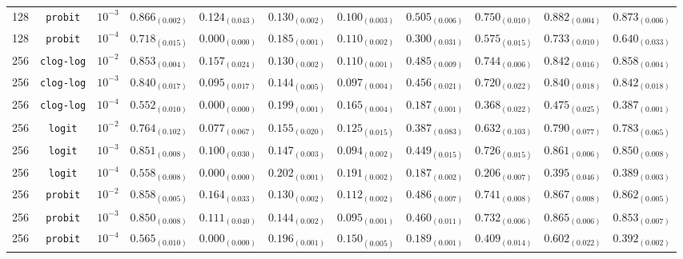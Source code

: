 \documentclass[journal]{IEEEtran}
\begin{document}
\begin{table}[!t]
\begin{tabular}{c@{\hskip 0.15cm}c@{\hskip 0.15cm}c@{\hskip 0.15cm}c@{\hskip 0.30cm}c@{\hskip 0.20cm}c@{\hskip 0.20cm}c@{\hskip 0.20cm}c@{\hskip 0.20cm}c@{\hskip 0.20cm}c@{\hskip 0.20cm}c}
			128 & \texttt{probit} & $10^{-3}$ & $0.866_{(0.002)}$ & $0.124_{(0.043)}$ & $0.130_{(0.002)}$ & $0.100_{(0.003)}$ & $0.505_{(0.006)}$ & $0.750_{(0.010)}$ & $0.882_{(0.004)}$ & $0.873_{(0.006)}$\\
			128 & \texttt{probit} & $10^{-4}$ & $0.718_{(0.015)}$ & $0.000_{(0.000)}$ & $0.185_{(0.001)}$ & $0.110_{(0.002)}$ & $0.300_{(0.031)}$ & $0.575_{(0.015)}$ & $0.733_{(0.010)}$ & $0.640_{(0.033)}$\\
			256 & \texttt{clog-log} & $10^{-2}$ & $0.853_{(0.004)}$ & $0.157_{(0.024)}$ & $0.130_{(0.002)}$ & $0.110_{(0.001)}$ & $0.485_{(0.009)}$ & $0.744_{(0.006)}$ & $0.842_{(0.016)}$ & $0.858_{(0.004)}$\\
			256 & \texttt{clog-log} & $10^{-3}$ & $0.840_{(0.017)}$ & $0.095_{(0.017)}$ & $0.144_{(0.005)}$ & $0.097_{(0.004)}$ & $0.456_{(0.021)}$ & $0.720_{(0.022)}$ & $0.840_{(0.018)}$ & $0.842_{(0.018)}$\\
			256 & \texttt{clog-log} & $10^{-4}$ & $0.552_{(0.010)}$ & $0.000_{(0.000)}$ & $0.199_{(0.001)}$ & $0.165_{(0.004)}$ & $0.187_{(0.001)}$ & $0.368_{(0.022)}$ & $0.475_{(0.025)}$ & $0.387_{(0.001)}$\\
			256 & \texttt{logit} & $10^{-2}$ & $0.764_{(0.102)}$ & $0.077_{(0.067)}$ & $0.155_{(0.020)}$ & $0.125_{(0.015)}$ & $0.387_{(0.083)}$ & $0.632_{(0.103)}$ & $0.790_{(0.077)}$ & $0.783_{(0.065)}$\\
			256 & \texttt{logit} & $10^{-3}$ & $0.851_{(0.008)}$ & $0.100_{(0.030)}$ & $0.147_{(0.003)}$ & $\mathbf{0.094_{(0.002)}}$ & $0.449_{(0.015)}$ & $0.726_{(0.015)}$ & $0.861_{(0.006)}$ & $0.850_{(0.008)}$\\
			256 & \texttt{logit} & $10^{-4}$ & $0.558_{(0.008)}$ & $0.000_{(0.000)}$ & $0.202_{(0.001)}$ & $0.191_{(0.002)}$ & $0.187_{(0.002)}$ & $0.206_{(0.007)}$ & $0.395_{(0.046)}$ & $0.389_{(0.003)}$\\
			256 & \texttt{probit} & $10^{-2}$ & $0.858_{(0.005)}$ & $0.164_{(0.033)}$ & $0.130_{(0.002)}$ & $0.112_{(0.002)}$ & $0.486_{(0.007)}$ & $0.741_{(0.008)}$ & $0.867_{(0.008)}$ & $0.862_{(0.005)}$\\
			256 & \texttt{probit} & $10^{-3}$ & $0.850_{(0.008)}$ & $0.111_{(0.040)}$ & $0.144_{(0.002)}$ & $\mathit{0.095_{(0.001)}}$ & $0.460_{(0.011)}$ & $0.732_{(0.006)}$ & $0.865_{(0.006)}$ & $0.853_{(0.007)}$\\
			256 & \texttt{probit} & $10^{-4}$ & $0.565_{(0.010)}$ & $0.000_{(0.000)}$ & $0.196_{(0.001)}$ & $0.150_{(0.005)}$ & $0.189_{(0.001)}$ & $0.409_{(0.014)}$ & $0.602_{(0.022)}$ & $0.392_{(0.002)}$\\
			\hline
			\hline
		\end{tabular}
	\end{table}
	
\end{document}
